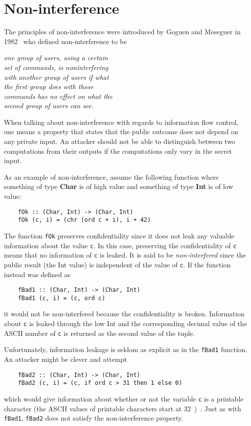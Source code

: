 \section{Non-interference}
The principles of non-interference were introduced by Goguen and Meseguer in 1982~\cite{non-interference-goguen-meseguer} who defined non-interference to be
\newline
\begin{center}
  \emph{one group of users, using a certain\\set of commands, is noninterfering\\with another group of users if what\\the first group does with those\\commands has no effect on what the\\second group of users can see.}
\end{center}
When talking about non-interference with regards to information flow control, one means a property that states that the public outcome does not depend on any private input. An attacker should not be able to distinguish between two computations from their outputs if the computations only vary in the secret input.

As an example of non-interference, assume the following function where something of type \textbf{Char} is of high value and something of type \textbf{Int} is of low value:
\begin{verbatim}
    fOk :: (Char, Int) -> (Char, Int)
    fOk (c, i) = (chr (ord c + i), i + 42)
\end{verbatim}
The function {\tt fOk} preserves confidentiality since it does not leak any valuable information about the value {\tt c}. In this case, preserving the confidentiality of {\tt c} means that no information of {\tt c} is leaked. It is said to be \emph{non-interfered} since the public result (the Int value) is independent of the value of {\tt c}. If the function instead was defined as
\begin{verbatim}
    fBad1 :: (Char, Int) -> (Char, Int)
    fBad1 (c, i) = (c, ord c)
\end{verbatim}
it would not be non-interfered because the confidentiality is broken. Information about {\tt c} is leaked through the low Int and the corresponding decimal value of the ASCII number of {\tt c} is returned as the second value of the tuple.

Unfortunately, information leakage is seldom as explicit as in the {\tt fBad1} function. An attacker might be clever and attempt
\begin{verbatim}
    fBad2 :: (Char, Int) -> (Char, Int)
    fBad2 (c, i) = (c, if ord c > 31 then 1 else 0)
\end{verbatim}
which would give information about whether or not the variable {\tt c} is a printable character (the ASCII values of printable characters start at 32~\cite{ascii})~\cite{seclib}. Just as with {\tt fBad1}, {\tt fBad2} does not satisfy the non-interference property.

